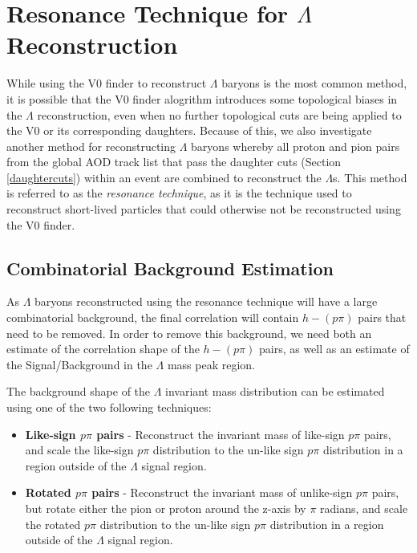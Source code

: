 \documentclass[ALICE,manyauthors]{ALICE_analysis_notes}
\begin{document}
\section{Resonance Technique for $\Lambda$ Reconstruction}
\label{resonance_technique}

While using the V0 finder to reconstruct $\Lambda$ baryons is the most common method, it is possible that the V0 finder alogrithm introduces some topological biases in the $\Lambda$ reconstruction, even when no further topological cuts are being applied to the V0 or its corresponding daughters. Because of this, we also investigate another method for reconstructing $\Lambda$ baryons whereby all proton and pion pairs from the global AOD track list that pass the daughter cuts (Section \ref{daughtercuts}) within an event are combined to reconstruct the $\Lambda$s. This method is referred to as the \textit{resonance technique}, as it is the technique used to reconstruct short-lived particles that could otherwise not be reconstructed using the V0 finder.

\subsection{Combinatorial Background Estimation}

As $\Lambda$ baryons reconstructed using the resonance technique will have a large combinatorial background, the final correlation will contain $h-(p\pi)$ pairs that need to be removed. In order to remove this background, we need both an estimate of the correlation shape of the $h-(p\pi)$ pairs, as well as an estimate of the Signal/Background in the $\Lambda$ mass peak region.

 The background shape of the $\Lambda$ invariant mass distribution can be estimated using one of the two following techniques:

 \begin{itemize}
	\item \textbf{Like-sign $p\pi$ pairs} - Reconstruct the invariant mass of like-sign $p\pi$ pairs, and scale the like-sign $p\pi$ distribution to the un-like sign $p\pi$ distribution in a region outside of the $\Lambda$ signal region.
	\item \textbf{Rotated $p\pi$ pairs} - Reconstruct the invariant mass of unlike-sign $p\pi$ pairs, but rotate either the pion or proton around the z-axis by $\pi$ radians, and scale the rotated $p\pi$ distribution to the un-like sign $p\pi$ distribution in a region outside of the $\Lambda$ signal region.
 \end{itemize}
\end{document}
